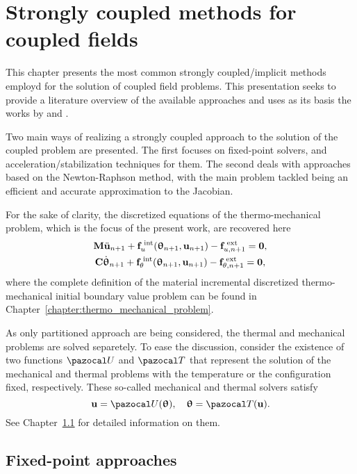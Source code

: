 \chapter{Strongly coupled methods for coupled fields}

This chapter presents the most common strongly coupled/implicit methods employd for the solution of coupled field problems.
This presentation seeks to provide a literature overview of the available approaches and uses as its basis the works by \cite{gatzhammer_efficient_2014} and \cite{}.

Two main ways of realizing a strongly coupled approach to the solution of the coupled problem are presented.
The first focuses on fixed-point solvers, and acceleration/stabilization techniques for them.
The second deals with approaches based on the Newton-Raphson method, with the main problem tackled being an efficient and accurate approximation to the Jacobian.

For the sake of clarity, the discretized equations of the thermo-mechanical problem, which is the focus of the present work, are recovered here
\begin{gather}
    \mathbf M \ddot{\mathbf u}_{n+1} +\mathbf f_u^\text{\;int}(\bm \uptheta_{n+1}, \mathbf u_{n+1})-\mathbf f^\text{\;ext}_{u,n+1}=\mathbf 0, \label{eq:mech_problem}\\
    \mathbf C \dot{\bm \uptheta}_{n+1} +\mathbf f_\theta^\text{\;int}(\bm \uptheta_{n+1}, \mathbf u_{n+1})-\mathbf f^\text{\;ext}_{\theta,n+1}=\mathbf 0, \label{eq:therm_problem}
\end{gather}
where the complete definition of the material incremental discretized thermo-mechanical initial boundary value problem can be found in Chapter~\ref{chapter:thermo_mechanical_problem}.

As only partitioned approach are being considered, the thermal and mechanical problems are solved separetely.
To ease the discussion, consider the existence of two functions \(\pazocal U\) and \(\pazocal T\) that represent the solution of the mechanical and thermal problems with the temperature or the configuration fixed, respectively.
These so-called mechanical and thermal solvers satisfy
\begin{equation}
  \mathbf u = \pazocal U(\bm \uptheta),\quad
  \bm \uptheta = \pazocal T(\mathbf u).
\end{equation}
See Chapter~\ref{} for detailed information on them.


\section{Fixed-point approaches}

